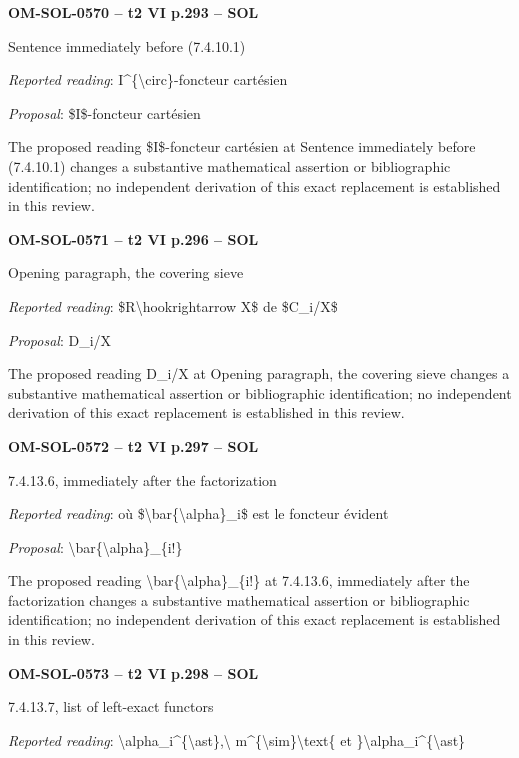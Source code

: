 \par\noindent\textbf{OM-SOL-0570 -- t2 VI p.293 -- SOL}\par
Sentence immediately before (7.4.10.1)\par
\emph{Reported reading}: I\textasciicircum{}\{\textbackslash{}circ\}-foncteur cartésien\par
\emph{Proposal}: \$I\$-foncteur cartésien\par
The proposed reading \$I\$-foncteur cartésien at Sentence immediately before (7.4.10.1) changes a substantive mathematical assertion or bibliographic identification; no independent derivation of this exact replacement is established in this review.\par
\par\noindent\textbf{OM-SOL-0571 -- t2 VI p.296 -- SOL}\par
Opening paragraph, the covering sieve\par
\emph{Reported reading}: \$R\textbackslash{}hookrightarrow X\$ de \$C\_i/X\$\par
\emph{Proposal}: D\_i/X\par
The proposed reading D\_i/X at Opening paragraph, the covering sieve changes a substantive mathematical assertion or bibliographic identification; no independent derivation of this exact replacement is established in this review.\par
\par\noindent\textbf{OM-SOL-0572 -- t2 VI p.297 -- SOL}\par
7.4.13.6, immediately after the factorization\par
\emph{Reported reading}: où \$\textbackslash{}bar\{\textbackslash{}alpha\}\_i\$ est le foncteur évident\par
\emph{Proposal}: \textbackslash{}bar\{\textbackslash{}alpha\}\_\{i!\}\par
The proposed reading \textbackslash{}bar\{\textbackslash{}alpha\}\_\{i!\} at 7.4.13.6, immediately after the factorization changes a substantive mathematical assertion or bibliographic identification; no independent derivation of this exact replacement is established in this review.\par
\par\noindent\textbf{OM-SOL-0573 -- t2 VI p.298 -- SOL}\par
7.4.13.7, list of left-exact functors\par
\emph{Reported reading}: \textbackslash{}alpha\_i\textasciicircum{}\{\textbackslash{}ast\},\textbackslash{} m\textasciicircum{}\{\textbackslash{}sim\}\textbackslash{}text\{ et \}\textbackslash{}alpha\_i\textasciicircum{}\{\textbackslash{}ast\}\par
